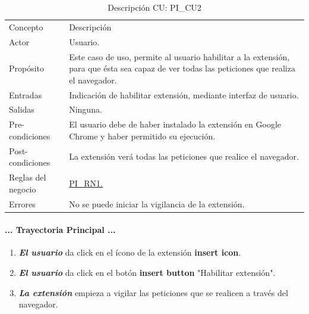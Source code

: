 \documentclass[12pt, a4paper, titlepage]{article}
\begin{document}
				\newpage
				\begin{table}[H]
				\begin{center}
				\begin{tabular}{ |p{3.5cm}||p{9.5cm}|}
					\hline
					\rowcolor{guindapoli}
					\multicolumn{2}{|c|}{\textbf{\textcolor{white}{Caso de uso: PI\_CU2. Habilitar extensión.}}}\\
					\hline
					\rowcolor{azulfuerte}Concepto & Descripción\\
					\hline
					\cellcolor{azulclaro}Actor & 
					Usuario.\\ 
					\hline
					\cellcolor{azulclaro}Propósito &
					Este caso de uso, permite al usuario habilitar a la extensión, para que ésta sea capaz de ver todas las peticiones que realiza el navegador.\\
					\hline
					\cellcolor{azulclaro}Entradas &
					Indicación de habilitar extensión, mediante interfaz de usuario.\\
					\hline
					\cellcolor{azulclaro}Salidas &
					Ninguna.\\
					\hline
					\cellcolor{azulclaro}Pre-condiciones&
					El usuario debe de haber instalado la extensión en Google Chrome y haber permitido su ejecución.\\
					\hline
					\cellcolor{azulclaro}Post-condiciones&
					La extensión verá todas las peticiones que realice el navegador.\\
					\hline
					\cellcolor{azulclaro}Reglas del negocio&
					\hyperref[PI_RN1]{PI\_RN1.}\\
					\hline
					\cellcolor{azulclaro}Errores &
					No se puede iniciar la vigilancia de la extensión.\\
					
					\hline
				\end{tabular}
				\caption[DCU: PI\_CU2]{Descripción CU: PI\_CU2}
				\end{center}
				\end{table}
				
				\paragraph{... Trayectoria Principal ...}
				\begin{enumerate}
					\item \textbf{\textit{El usuario}} da click en el ícono de la extensión \textbf{insert icon}.
					\item \textbf{\textit{El usuario}} da click en el botón \textbf{insert button} "Habilitar extensión".
					\item \textbf{\textit{La extensión}} empieza a vigilar las peticiones que se realicen a través del navegador.
				\end{enumerate}
\end{document}
